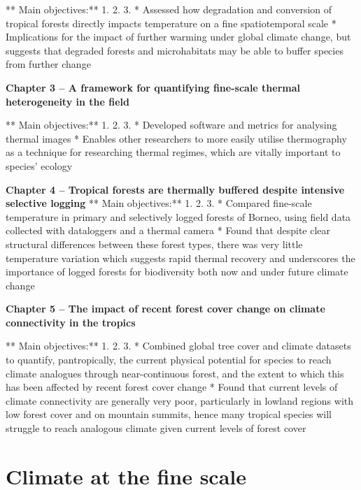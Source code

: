 \documentclass[12pt,a4paper,]{report}
\theoremstyle{definition}
\theoremstyle{definition}
\theoremstyle{definition}
\theoremstyle{remark}
\begin{document}
** Main objectives:** 1. 2. 3. * Assessed how degradation and conversion
of tropical forests directly impacts temperature on a fine
spatiotemporal scale * Implications for the impact of further warming
under global climate change, but suggests that degraded forests and
microhabitats may be able to buffer species from further change

\textbf{Chapter 3 -- A framework for quantifying fine-scale thermal
heterogeneity in the field}

** Main objectives:** 1. 2. 3. * Developed software and metrics for
analysing thermal images * Enables other researchers to more easily
utilise thermography as a technique for researching thermal regimes,
which are vitally important to species' ecology

\textbf{Chapter 4 -- Tropical forests are thermally buffered despite
intensive selective logging} ** Main objectives:** 1. 2. 3. * Compared
fine-scale temperature in primary and selectively logged forests of
Borneo, using field data collected with dataloggers and a thermal camera
* Found that despite clear structural differences between these forest
types, there was very little temperature variation which suggests rapid
thermal recovery and underscores the importance of logged forests for
biodiversity both now and under future climate change

\textbf{Chapter 5 -- The impact of recent forest cover change on climate
connectivity in the tropics}

** Main objectives:** 1. 2. 3. * Combined global tree cover and climate
datasets to quantify, pantropically, the current physical potential for
species to reach climate analogues through near-continuous forest, and
the extent to which this has been affected by recent forest cover change
* Found that current levels of climate connectivity are generally very
poor, particularly in lowland regions with low forest cover and on
mountain summits, hence many tropical species will struggle to reach
analogous climate given current levels of forest cover

\section{Climate at the fine scale}\label{climate-at-the-fine-scale}
\end{document}

